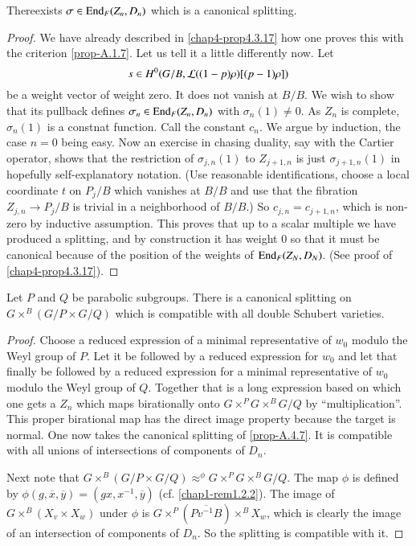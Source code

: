 \begin{proposition}\label{prop-A.4.7}
There\pageoriginale exists\label{page87} $\sigma\in \operatorname{End}_{F}(Z_{n},D_{n})$ which is
a canonical splitting.
\end{proposition}

\begin{proof}
We have already described in \ref{chap4-prop4.3.17} how one proves
this with the criterion \ref{prop-A.1.7}. Let us tell it a little
differently now. Let 
$$
s\in H^{0}(G/B,\mathcal{L}((1-p)\rho)[(p-1)\rho])
$$ 
be a
weight vector of weight zero. It does not vanish at $B/B$. We wish to
show that its pullback defines $\sigma_{n}\in \operatorname{End}_{F}(Z_{n},D_{n})$
with $\sigma_{n}(1)\neq 0$. As $Z_{n}$ is complete, $\sigma_{n}(1)$ is
a constnat function. Call the constant $c_{n}$. We argue by induction,
the case $n=0$ being easy. Now an exercise in chasing duality, say
with the Cartier operator, shows that the restriction of
$\sigma_{j,n}(1)$ to $Z_{j+1,n}$ is just $\sigma_{j+1,n}(1)$ in
hopefully self-explanatory notation. (Use reasonable identifications,
choose a local coordinate $t$ on $P_{j}/B$ which vanishes at $B/B$ and
use that the fibration $Z_{j,n}\to P_{j}/B$ is trivial in a
neighborhood of $B/B$.) So $c_{j,n}=c_{j+1,n}$, which is non-zero by
inductive assumption. This proves that up to a scalar multiple we have
produced a splitting, and by construction it has weight $0$ so that it
must be canonical because of the position of the weights of
$\operatorname{End}_{F}(Z_{N},D_{N})$. (See proof of \ref{chap4-prop4.3.17}).
\end{proof}

\begin{proposition}\label{prop-A.4.8}
Let $P$ and $Q$ be parabolic subgroups. There is a canonical splitting
on $G\times^{B}(G/P\times G/Q)$ which is compatible with all double
Schubert varieties.
\end{proposition}

\begin{proof}
Choose a reduced expression of a minimal representative of $w_{0}$
modulo the Weyl group of $P$. Let it be followed by a reduced
expression for $w_{0}$ and let that finally be followed by a reduced
expression for a minimal representative of $w_{0}$ modulo the Weyl
group of $Q$. Together that is a long expression based on which one
gets a $Z_{n}$ which maps birationally onto
$G\times^{P}G\times^{B}G/Q$ by ``multiplication''. This proper
birational map has the direct image property because the target is
normal. One now takes the canonical splitting of \ref{prop-A.4.7}. It
is compatible with all unions of intersections of components of
$D_{n}$.

Next note that $G\times^{B}(G/P\times
G/Q){\displaystyle{\mathop{\approx}^{\phi}}}G\times^{P}G\times^{B}G/Q$. The
map $\phi$ is defined by
$\phi(g,\overline{x},\overline{y})=(gx,x^{-1},\overline{y})$ (cf.\@
\ref{chap1-rem1.2.2}). The image of $G\times^{B}(X_{v}\times X_{w})$
under $\phi$ is $G\times^{P}(\overline{Pv^{-1}B})\times^{B}X_{w}$,
which is clearly the image of an intersection of components of
$D_{n}$. So the splitting is compatible with it.
\end{proof}

